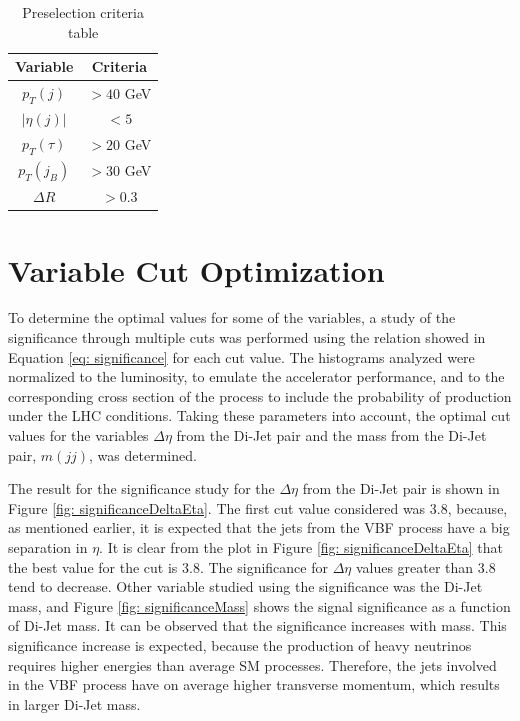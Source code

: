 \begin{table}
\centering
\begin{tabular}{|c|c|}
\hline
Variable & Criteria \\
\hline
$p_{T}(j)$ & $> 40$ GeV \\
$|\eta(j)|$ & $< 5$ \\ 
$p_{T}(\tau)$ & $> 20$ GeV \\
$p_{T}(j_{B})$ & $>30$ GeV \\
$\Delta R$ & $>0.3$ \\
\hline
\end{tabular}
\caption{Preselection criteria table}
\label{table: preselection}
\end{table}

\section{Variable Cut Optimization}\label{section: cutOptimization}

To determine the optimal values for some of the variables, a study of the significance through multiple cuts was performed using the relation showed in Equation \ref{eq: significance} for each cut value. The histograms analyzed were normalized to the luminosity, to emulate the accelerator performance, and to the corresponding cross section of the process to include the probability of production under the LHC conditions. Taking these parameters into account, the optimal cut values for the variables $\Delta \eta$ from the Di-Jet pair and the mass from the Di-Jet pair, $m(jj)$, was determined.

The result for the significance study for the $\Delta \eta$ from the Di-Jet pair is shown in Figure \ref{fig: significanceDeltaEta}. The first cut value considered was 3.8, because, as mentioned earlier, it is expected that the jets from the VBF process have a big separation in $\eta$. It is clear from the plot in Figure \ref{fig: significanceDeltaEta} that the best value for the cut is 3.8. The significance for $\Delta \eta$ values greater than 3.8 tend to decrease. Other variable studied using the significance was the Di-Jet mass, and Figure \ref{fig: significanceMass} shows the signal significance as a function of Di-Jet mass. It can be observed that the significance increases with mass. This significance increase is expected, because the production of heavy neutrinos requires higher energies than average SM processes. Therefore, the jets involved in the VBF process have on average higher transverse momentum, which results in larger Di-Jet mass. 

